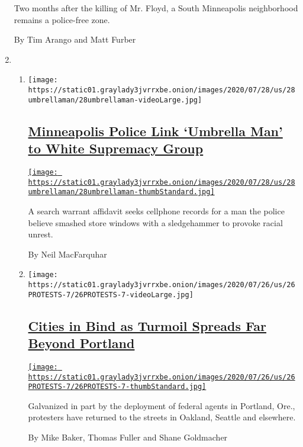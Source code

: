 \begin{enumerate}
  Two months after the killing of Mr. Floyd, a South Minneapolis
  neighborhood remains a police-free zone.

  By Tim Arango and Matt Furber
\item
  \begin{enumerate}
  \def\labelenumii{\arabic{enumii}.}
  \item
    \texttt{[image: https://static01.graylady3jvrrxbe.onion/images/2020/07/28/us/28umbrellaman/28umbrellaman-videoLarge.jpg]}

    \hypertarget{minneapolis-police-link-umbrella-man-to-white-supremacy-group}{%
    \subsection{\texorpdfstring{\href{/2020/07/28/us/umbrella-man-identified-minneapolis.html}{Minneapolis
    Police Link `Umbrella Man' to White Supremacy
    Group}}{Minneapolis Police Link `Umbrella Man' to White Supremacy Group}}\label{minneapolis-police-link-umbrella-man-to-white-supremacy-group}}

    \href{/2020/07/28/us/umbrella-man-identified-minneapolis.html}{\texttt{[image: https://static01.graylady3jvrrxbe.onion/images/2020/07/28/us/28umbrellaman/28umbrellaman-thumbStandard.jpg]}}

    A search warrant affidavit seeks cellphone records for a man the
    police believe smashed store windows with a sledgehammer to provoke
    racial unrest.

    By Neil MacFarquhar
  \item
    \texttt{[image: https://static01.graylady3jvrrxbe.onion/images/2020/07/26/us/26PROTESTS-7/26PROTESTS-7-videoLarge.jpg]}

    \hypertarget{cities-in-bind-as-turmoil-spreads-far-beyond-portland}{%
    \subsection{\texorpdfstring{\href{/2020/07/26/us/protests-portland-seattle-trump.html}{Cities
    in Bind as Turmoil Spreads Far Beyond
    Portland}}{Cities in Bind as Turmoil Spreads Far Beyond Portland}}\label{cities-in-bind-as-turmoil-spreads-far-beyond-portland}}

    \href{/2020/07/26/us/protests-portland-seattle-trump.html}{\texttt{[image: https://static01.graylady3jvrrxbe.onion/images/2020/07/26/us/26PROTESTS-7/26PROTESTS-7-thumbStandard.jpg]}}

    Galvanized in part by the deployment of federal agents in Portland,
    Ore., protesters have returned to the streets in Oakland, Seattle
    and elsewhere.

    By Mike Baker, Thomas Fuller and Shane Goldmacher
  \end{enumerate}
\end{enumerate}

